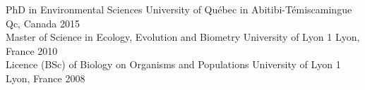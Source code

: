 


\begin{cvhonors}

  \cvhonor
            {\normalsize PhD in Environmental Sciences} %
{University of Québec in Abitibi-Témiscamingue} %
{Qc, Canada} %
        {\normalsize 2015} %
\\
        \cvhonor
        {\normalsize Master of Science in Ecology, Evolution and Biometry} %
{University of Lyon 1} %
{Lyon, France} %
         {\normalsize 2010} %
\\
         \cvhonor
        {\normalsize Licence (BSc) of Biology on Organisms and Populations} %
{University of Lyon 1} %
{Lyon, France} %
        {\normalsize 2008} %

 
 
\end{cvhonors}







